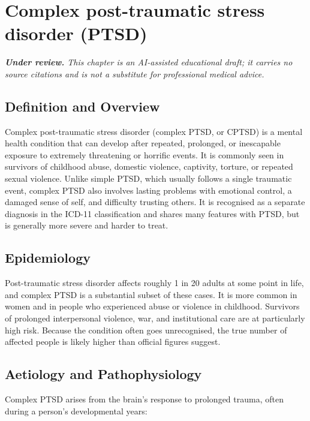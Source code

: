 \chapter{Complex post-traumatic stress disorder (PTSD)}

\medskip
\noindent\textit{\textbf{Under review.} This chapter is an AI-assisted educational draft; it carries no source citations and is not a substitute for professional medical advice.}

\section*{Definition and Overview}
Complex post-traumatic stress disorder (complex PTSD, or CPTSD) is a mental health condition that can develop after repeated, prolonged, or inescapable exposure to extremely threatening or horrific events. It is commonly seen in survivors of childhood abuse, domestic violence, captivity, torture, or repeated sexual violence. Unlike simple PTSD, which usually follows a single traumatic event, complex PTSD also involves lasting problems with emotional control, a damaged sense of self, and difficulty trusting others. It is recognised as a separate diagnosis in the ICD-11 classification and shares many features with PTSD, but is generally more severe and harder to treat.

\section*{Epidemiology}
Post-traumatic stress disorder affects roughly 1 in 20 adults at some point in life, and complex PTSD is a substantial subset of these cases. It is more common in women and in people who experienced abuse or violence in childhood. Survivors of prolonged interpersonal violence, war, and institutional care are at particularly high risk. Because the condition often goes unrecognised, the true number of affected people is likely higher than official figures suggest.

\section*{Aetiology and Pathophysiology}
Complex PTSD arises from the brain's response to prolonged trauma, often during a person's developmental years:

